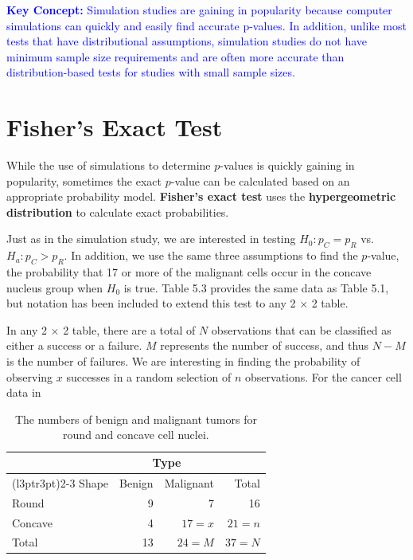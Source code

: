 \documentclass[
]{book}
\begin{document}
\textbf{\textcolor{blue}{Key Concept:}}
\textcolor{blue}{Simulation studies are gaining in popularity because computer simulations can quickly and easily find accurate p-values. In addition, unlike most tests that have distributional assumptions, simulation studies do not have minimum sample size requirements and are often more accurate than distribution-based tests for studies with small sample sizes.}

\hypertarget{fishers-exact-test}{%
\section{Fisher's Exact Test}\label{fishers-exact-test}}

While the use of simulations to determine \(p\)-values is quickly gaining in popularity, sometimes the exact \(p\)-value can be calculated based on an appropriate probability model. \textbf{Fisher's exact test} uses the \textbf{hypergeometric distribution} to calculate exact probabilities.

Just as in the simulation study, we are interested in testing \(H_0: p_C = p_R\) vs.~\(H_a: p_C > p_R\). In addition, we use the same three assumptions to find the \(p\)-value, the probability that 17 or more of the malignant cells occur in the concave nucleus group when \(H_0\) is true. Table 5.3 provides the same data as Table 5.1, but notation has been included to extend this test to any 2 × 2 table.

In any 2 × 2 table, there are a total of \(N\) observations that can be classified as either a success or a failure. \(M\) represents the number of success, and thus \(N - M\) is the number of failures. We are interesting in finding the probability of observing \(x\) successes in a random selection of \(n\) observations. For the cancer cell data in

\begin{table}[H]
\centering
\caption{\label{tab:tab53}The numbers of benign and malignant tumors for round and concave cell nuclei.}
\centering
\begin{tabular}[t]{lrrr}
\toprule
\multicolumn{1}{c}{ } & \multicolumn{2}{c}{Type} & \multicolumn{1}{c}{ } \\
\cmidrule(l{3pt}r{3pt}){2-3}
Shape & Benign & Malignant & Total\\
\midrule
Round & 9 & 7 & 16\\
Concave & 4 & $17 = x$ & $21 = n$\\
Total & 13 & $24 = M$ & $37 = N$\\
\bottomrule
\end{tabular}
\end{table}
\end{document}
